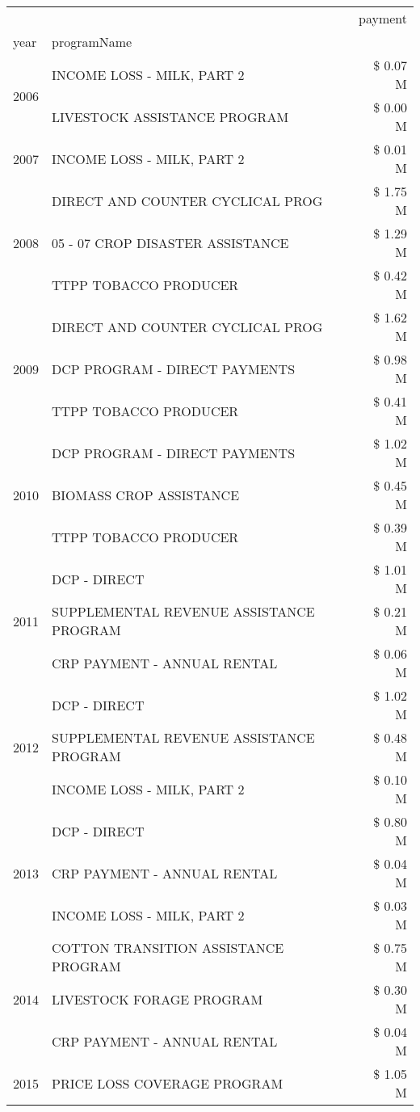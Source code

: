 \begin{tabular}{llr}
\toprule
 &  & payment \\
year & programName &  \\
\midrule
\multirow[t]{2}{*}{2006} & INCOME LOSS - MILK, PART 2 & \$ 0.07 M \\
 & LIVESTOCK ASSISTANCE PROGRAM & \$ 0.00 M \\
\cline{1-3}
2007 & INCOME LOSS - MILK, PART 2 & \$ 0.01 M \\
\cline{1-3}
\multirow[t]{3}{*}{2008} & DIRECT AND COUNTER CYCLICAL PROG & \$ 1.75 M \\
 & 05 - 07 CROP DISASTER ASSISTANCE & \$ 1.29 M \\
 & TTPP TOBACCO PRODUCER & \$ 0.42 M \\
\cline{1-3}
\multirow[t]{3}{*}{2009} & DIRECT AND COUNTER CYCLICAL PROG & \$ 1.62 M \\
 & DCP PROGRAM - DIRECT PAYMENTS & \$ 0.98 M \\
 & TTPP TOBACCO PRODUCER & \$ 0.41 M \\
\cline{1-3}
\multirow[t]{3}{*}{2010} & DCP PROGRAM - DIRECT PAYMENTS & \$ 1.02 M \\
 & BIOMASS CROP ASSISTANCE & \$ 0.45 M \\
 & TTPP TOBACCO PRODUCER & \$ 0.39 M \\
\cline{1-3}
\multirow[t]{3}{*}{2011} & DCP - DIRECT & \$ 1.01 M \\
 & SUPPLEMENTAL REVENUE ASSISTANCE PROGRAM & \$ 0.21 M \\
 & CRP PAYMENT - ANNUAL RENTAL & \$ 0.06 M \\
\cline{1-3}
\multirow[t]{3}{*}{2012} & DCP - DIRECT & \$ 1.02 M \\
 & SUPPLEMENTAL REVENUE ASSISTANCE PROGRAM & \$ 0.48 M \\
 & INCOME LOSS - MILK, PART 2 & \$ 0.10 M \\
\cline{1-3}
\multirow[t]{3}{*}{2013} & DCP - DIRECT & \$ 0.80 M \\
 & CRP PAYMENT - ANNUAL RENTAL & \$ 0.04 M \\
 & INCOME LOSS - MILK, PART 2 & \$ 0.03 M \\
\cline{1-3}
\multirow[t]{3}{*}{2014} & COTTON TRANSITION ASSISTANCE PROGRAM & \$ 0.75 M \\
 & LIVESTOCK FORAGE PROGRAM & \$ 0.30 M \\
 & CRP PAYMENT - ANNUAL RENTAL & \$ 0.04 M \\
\cline{1-3}
\multirow[t]{3}{*}{2015} & PRICE LOSS COVERAGE PROGRAM & \$ 1.05 M \\

\end{tabular}
